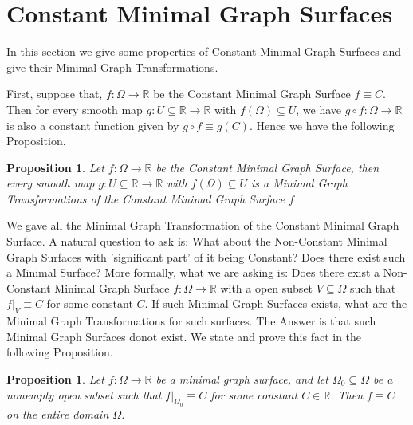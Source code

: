 \documentclass[12pt]{article}
\theoremstyle{plain}
\newtheorem{proposition}[theorem]{Proposition}
\theoremstyle{definition}
\theoremstyle{remark}
\begin{document}
      
    
    \section{Constant Minimal Graph Surfaces}
    In this section we give some properties of Constant Minimal Graph Surfaces and give their Minimal Graph Transformations.
    
    First, suppose that, \(f: \Omega \longrightarrow \mathbb{R}\) be the Constant Minimal Graph Surface \(f\equiv C\). Then for every smooth map \(g: U \subseteq \mathbb{R} \longrightarrow \mathbb{R}\) with  \(f(\Omega)\subseteq U\), we have \(g \circ f: \Omega \longrightarrow \mathbb{R}\) is also a constant function given by \(g \circ f\equiv g(C)\). Hence we have the following Proposition.
	\begin{proposition}
		\label{thm: MGT of Const MGS}
	    Let \(f: \Omega \longrightarrow \mathbb{R}\) be the Constant Minimal Graph Surface, then every smooth map \(g: U \subseteq \mathbb{R} \longrightarrow \mathbb{R}\) with  \(f(\Omega)\subseteq U\) is a  Minimal Graph Transformations of the Constant Minimal Graph Surface \(f\) 	
	\end{proposition}

    We gave all the Minimal Graph Transformation of the Constant Minimal Graph Surface. A natural question to ask is: What about the Non-Constant Minimal Graph Surfaces with 'significant part' of it being Constant? Does there exist such a Minimal Surface? More formally, what we are asking is: Does there exist a Non-Constant Minimal Graph Surface \(f: \Omega \longrightarrow \mathbb{R}\) with a open subset \(V\subseteq\Omega\) such that \(f\big|_V\equiv C\) for some constant \(C\). If such Minimal Graph Surfaces exists, what are the Minimal Graph Transformations for such surfaces. The Answer is that such Minimal Graph Surfaces donot exist. We state and prove this fact in the following Proposition.

   \begin{proposition}
   	   \label{thm: MGS is non-constant everywhere}
	   Let \( f : \Omega \longrightarrow \mathbb{R} \) be a minimal graph surface, and let \( \Omega_0 \subseteq \Omega \) be a nonempty open subset such that \( f|_{\Omega_0} \equiv C \) for some constant \( C \in \mathbb{R} \). Then \( f \equiv C \) on the entire domain \( \Omega \).
   \end{proposition}
\end{document}
